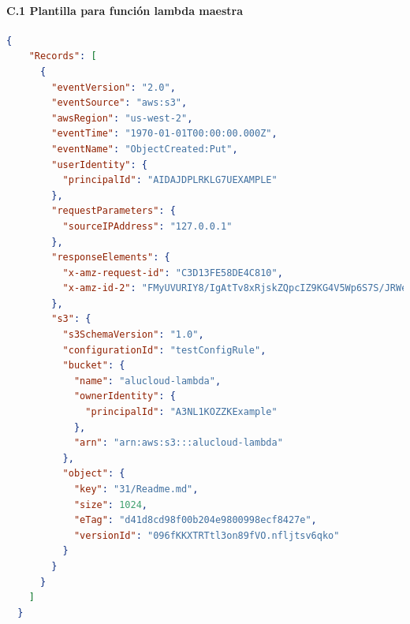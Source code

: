 \documentclass[
]{article}
\begin{document}
\hypertarget{header-n226}{%
\paragraph{C.1 Plantilla para función lambda
maestra}\label{header-n226}}
\leavevmode
\newline
\begin{lstlisting}[language=json,firstnumber=1]
{
    "Records": [
      {
        "eventVersion": "2.0",
        "eventSource": "aws:s3",
        "awsRegion": "us-west-2",
        "eventTime": "1970-01-01T00:00:00.000Z",
        "eventName": "ObjectCreated:Put",
        "userIdentity": {
          "principalId": "AIDAJDPLRKLG7UEXAMPLE"
        },
        "requestParameters": {
          "sourceIPAddress": "127.0.0.1"
        },
        "responseElements": {
          "x-amz-request-id": "C3D13FE58DE4C810",
          "x-amz-id-2": "FMyUVURIY8/IgAtTv8xRjskZQpcIZ9KG4V5Wp6S7S/JRWeUWerMUE5JgHvANOjpD"
        },
        "s3": {
          "s3SchemaVersion": "1.0",
          "configurationId": "testConfigRule",
          "bucket": {
            "name": "alucloud-lambda",
            "ownerIdentity": {
              "principalId": "A3NL1KOZZKExample"
            },
            "arn": "arn:aws:s3:::alucloud-lambda"
          },
          "object": {
            "key": "31/Readme.md",
            "size": 1024,
            "eTag": "d41d8cd98f00b204e9800998ecf8427e",
            "versionId": "096fKKXTRTtl3on89fVO.nfljtsv6qko"
          }
        }
      }
    ]
  }
\end{lstlisting}
\end{document}
